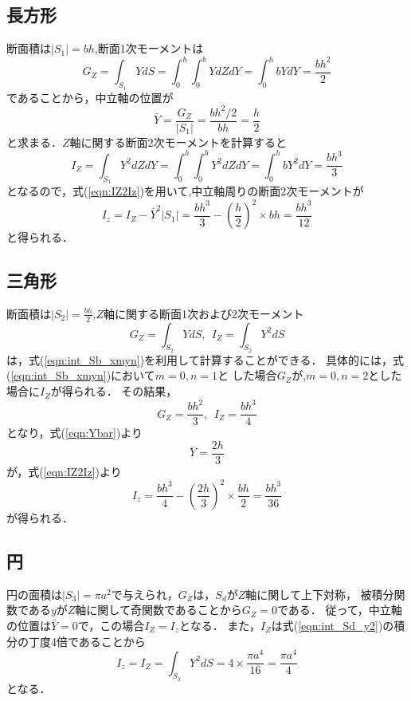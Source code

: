 ﻿\documentclass[10pt,a4j]{jbook}
\begin{document}
\subsection{長方形}
断面積は$\left|S_1\right|=bh$,断面1次モーメントは
\begin{equation}
	G_Z=\int_{S_1} Y dS=\int_0^h\int_0^b Y dZdY=\int_0^h bYdY=\frac{bh^2}{2}
	\label{eqn:GZ_S1}
\end{equation}
であることから，中立軸の位置が
\begin{equation}
	\bar Y= \frac{G_Z}{\left| S_1 \right|}=\frac{bh^2/2}{bh}=\frac{h}{2}
\end{equation}
と求まる．$Z$軸に関する断面2次モーメントを計算すると
\begin{equation}
	I_Z=\int_{S_1} Y^2dZdY
	=\int_0^h \int_0^b Y^2dZdY 
	=\int_0^h bY^2dY 
	=\frac{bh^3}{3}
	\label{eqn:IZ_S1}
\end{equation}
となるので，式(\ref{eqn:IZ2Iz})を用いて,中立軸周りの断面2次モーメントが
\begin{equation}
	I_z= I_Z-\bar Y^2 \left| S_1 \right| = \frac{bh^3}{3}-\left(\frac{h}{2}\right)^2\times bh=\frac{bh^3}{12}
	\label{eqn:Iz_S1}
\end{equation}
と得られる．
\subsection{三角形}
断面積は$\left|S_2\right|=\frac{bh}{2}$,$Z$軸に関する断面1次および2次モーメント
\begin{equation}
	G_Z=\int_{S_2} Y dS, \ \ I_Z=\int_{S_2}Y^2 dS
\end{equation}
は，式(\ref{eqn:int_Sb_xmyn})を利用して計算することができる．
具体的には，式(\ref{eqn:int_Sb_xmyn})において$m=0, n=1$と
した場合$G_Z$が,$m=0, n=2$とした場合に$I_Z$が得られる．
その結果，
\begin{equation}
	G_Z=\frac{bh^2}{3}, \ \ 
	I_Z=\frac{bh^3}{4}
	\label{eqn:GI_S2}
\end{equation}
となり，式(\ref{eqn:Ybar})より
\begin{equation}
	\bar{Y}=\frac{2h}{3}
\end{equation}
が，式(\ref{eqn:IZ2Iz})より
\begin{equation}
	I_z=\frac{bh^3}{4}-\left(\frac{2h}{3}\right)^2\times \frac{bh}{2}=\frac{bh^3}{36}
	\label{eqn:Iz_S2}
\end{equation}
が得られる．
\subsection{円}
円の面積は$\left|S_3\right|=\pi a^2$で与えられ，$G_Z$は，$S_d$が$Z$軸に関して上下対称，
被積分関数である$y$が$Z$軸に関して奇関数であることから$G_Z=0$である．
従って，中立軸の位置は$\bar Y=0$で，この場合$I_Z=I_z$となる．
また，$I_Z$は式(\ref{eqn:int_Sd_y2})の積分の丁度4倍であることから
\begin{equation}
	I_z=I_Z=\int_{S_3}Y^2dS=4\times \frac{\pi a^4}{16}=\frac{\pi a^4}{4}
	\label{eqn:Iz_S3}
\end{equation}
となる．
\end{document}

